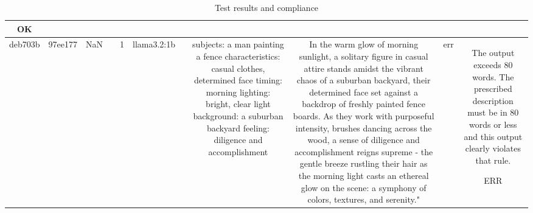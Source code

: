 \begin{table}[h!]
\begin{tabular}{|c|c|c|c|c|c|c|c|c|c|c|}
OK\\
\hline
deb703b & 97ee177 & NaN &  & 1 & llama3.2:1b &  & subjects: a man painting a fence
characteristics: casual clothes, determined face
timing: morning
lighting: bright, clear light
background: a suburban backyard
feeling: diligence and accomplishment & In the warm glow of morning sunlight, a solitary figure in casual attire stands amidst the vibrant chaos of a suburban backyard, their determined face set against a backdrop of freshly painted fence boards. As they work with purposeful intensity, brushes dancing across the wood, a sense of diligence and accomplishment reigns supreme - the gentle breeze rustling their hair as the morning light casts an ethereal glow on the scene: a symphony of colors, textures, and serenity." & err & The output exceeds 80 words. The prescribed description must be in 80 words or less and this output clearly violates that rule.

ERR
  \end{tabular}
  \caption{Test results and compliance}
  
  \end{table}
  
